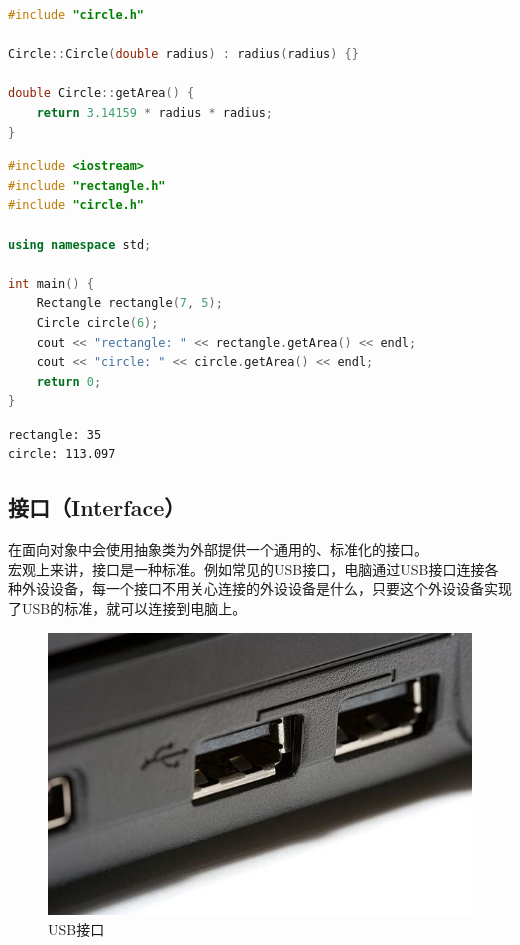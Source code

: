 \begin{lstlisting}[language=C++, title=circle.cpp]
#include "circle.h"

Circle::Circle(double radius) : radius(radius) {}

double Circle::getArea() {
	return 3.14159 * radius * radius;
}
\end{lstlisting}

\begin{lstlisting}[language=C++, title=test\_shape.cpp]
#include <iostream>
#include "rectangle.h"
#include "circle.h"

using namespace std;

int main() {
	Rectangle rectangle(7, 5);
	Circle circle(6);
	cout << "rectangle: " << rectangle.getArea() << endl;
	cout << "circle: " << circle.getArea() << endl;
	return 0;
}
\end{lstlisting}

\begin{tcolorbox}
	\begin{verbatim}
rectangle: 35
circle: 113.097
	\end{verbatim}
\end{tcolorbox}

\vspace{0.5cm}

\subsection{接口（Interface）}

在面向对象中会使用抽象类为外部提供一个通用的、标准化的接口。\\

宏观上来讲，接口是一种标准。例如常见的USB接口，电脑通过USB接口连接各种外设设备，每一个接口不用关心连接的外设设备是什么，只要这个外设设备实现了USB的标准，就可以连接到电脑上。

\begin{figure}[H]
	\centering
	\includegraphics[scale=0.4]{img/C4/4-3/1.png}
	\caption{USB接口}
\end{figure}

